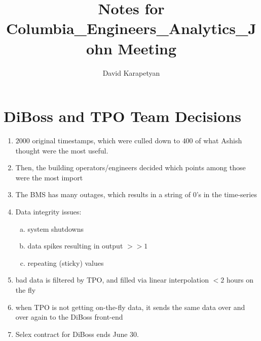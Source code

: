 \documentclass[12pt,a4paper]{article}
\author{David Karapetyan}
\title{Notes for Columbia_Engineers_Analytics_John Meeting}
\begin{document}
	\section{DiBoss and TPO Team Decisions}
\begin{enumerate} 
	\item $2000$ original timestamps, which were culled down to $400$ of what 
	Ashish thought were the most useful.
	\item Then, the building operators/engineers decided which points among
	those were the most import
	\item The BMS has many outages, which results in a string of $0$'s
	in the time-series
	\item Data integrity issues:
	\begin{enumerate}[(a)]
		\item system shutdowns 
		\item data spikes resulting in output $>> 1$
		\item repeating (sticky) values
	\end{enumerate}
	\item bad data is filtered by TPO, and filled via linear interpolation $<2$
	hours on the fly
	\item when TPO is not getting on-the-fly data, it sends the same data
	over and over again to the DiBoss front-end
	\item Selex contract for DiBoss ends June $30$.
\end{enumerate}
\end{document}

